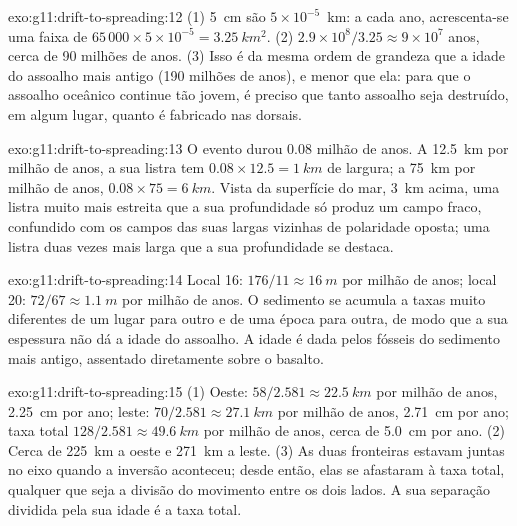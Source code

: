 \begin{solution}{exo:g11:drift-to-spreading:12}
(1) \qty{5}{cm} são $5 \times 10^{-5}$~\unit{km}: a cada ano, acrescenta-se
uma faixa de $65\,000 \times 5 \times 10^{-5} = \qty{3.25}{km^2}$.
(2) $2.9 \times 10^8/3.25 \approx 9 \times 10^7$ anos, cerca de 90 milhões
de anos. (3) Isso é da mesma ordem de grandeza que a idade do assoalho mais
antigo (190 milhões de anos), e menor que ela: para que o assoalho oceânico
continue tão jovem, é preciso que tanto assoalho seja destruído, em algum
lugar, quanto é fabricado nas dorsais.
\end{solution}

\begin{solution}{exo:g11:drift-to-spreading:13}
O evento durou \num{0.08} milhão de anos. A \qty{12.5}{km} por milhão de
anos, a sua listra tem $0.08 \times 12.5 = \qty{1}{km}$ de largura; a
\qty{75}{km} por milhão de anos, $0.08 \times 75 = \qty{6}{km}$. Vista da
superfície do mar, \qty{3}{km} acima, uma listra muito mais estreita que a
sua profundidade só produz um campo fraco, confundido com os campos das suas
largas vizinhas de polaridade oposta; uma listra duas vezes mais larga que a
sua profundidade se destaca.
\end{solution}

\begin{solution}{exo:g11:drift-to-spreading:14}
Local 16: $176/11 \approx \qty{16}{m}$ por milhão de anos; local 20: $72/67
\approx \qty{1.1}{m}$ por milhão de anos. O sedimento se acumula a taxas
muito diferentes de um lugar para outro e de uma época para outra, de modo
que a sua espessura não dá a idade do assoalho. A idade é dada pelos
fósseis do sedimento mais antigo, assentado diretamente sobre o basalto.
\end{solution}

\begin{solution}{exo:g11:drift-to-spreading:15}
(1) Oeste: $58/2.581 \approx \qty{22.5}{km}$ por milhão de anos,
\qty{2.25}{cm} por ano; leste: $70/2.581 \approx \qty{27.1}{km}$ por milhão
de anos, \qty{2.71}{cm} por ano; taxa total $128/2.581 \approx \qty{49.6}{km}$ por
milhão de anos, cerca de \qty{5.0}{cm} por ano. (2) Cerca de \qty{225}{km} a
oeste e \qty{271}{km} a leste. (3) As duas fronteiras estavam juntas no eixo
quando a inversão aconteceu; desde então, elas se afastaram à taxa total,
qualquer que seja a divisão do movimento entre os dois lados. A sua
separação dividida pela sua idade é a taxa total.
\end{solution}

